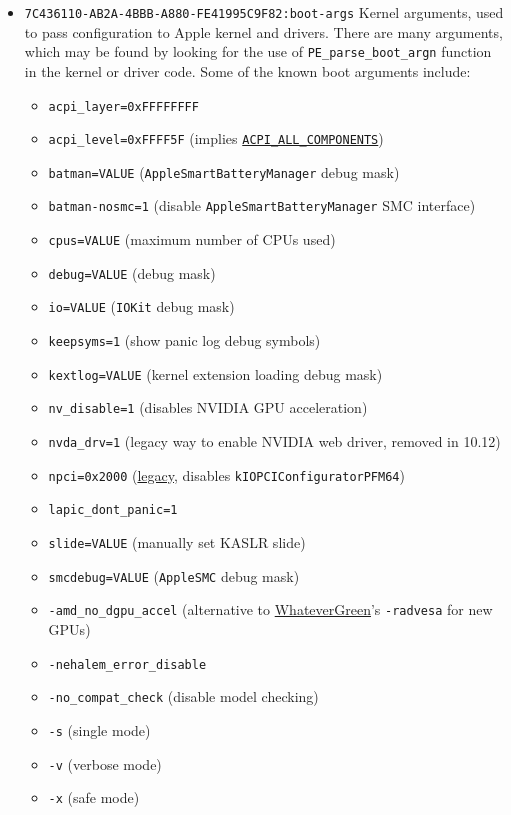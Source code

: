 \documentclass[]{article}
\providecommand{\tightlist}{%
  \setlength{\itemsep}{0pt}\setlength{\parskip}{0pt}}
\begin{document}
\begin{itemize}
\tightlist
\item
  \texttt{7C436110-AB2A-4BBB-A880-FE41995C9F82:boot-args}
  \break
  Kernel arguments, used to pass configuration to Apple kernel and drivers.
  There are many arguments, which may be found by looking for the use of
  \texttt{PE\_parse\_boot\_argn} function in the kernel or driver code.
  Some of the known boot arguments include:

  \begin{itemize}
  \item \texttt{acpi\_layer=0xFFFFFFFF}
  \item \texttt{acpi\_level=0xFFFF5F} (implies
    \href{https://github.com/acpica/acpica/blob/master/source/include/acoutput.h}
    {\texttt{ACPI\_ALL\_COMPONENTS}})
  \item \texttt{batman=VALUE} (\texttt{AppleSmartBatteryManager} debug mask)
  \item \texttt{batman-nosmc=1} (disable \texttt{AppleSmartBatteryManager} SMC interface)
  \item \texttt{cpus=VALUE} (maximum number of CPUs used)
  \item \texttt{debug=VALUE} (debug mask)
  \item \texttt{io=VALUE} (\texttt{IOKit} debug mask)
  \item \texttt{keepsyms=1} (show panic log debug symbols)
  \item \texttt{kextlog=VALUE} (kernel extension loading debug mask)
  \item \texttt{nv\_disable=1} (disables NVIDIA GPU acceleration)
  \item \texttt{nvda\_drv=1} (legacy way to enable NVIDIA web driver, removed in 10.12)
  \item \texttt{npci=0x2000} (\href{https://www.insanelymac.com/forum/topic/260539-1068-officially-released/?do=findComment&comment=1707972}{legacy}, disables \texttt{kIOPCIConfiguratorPFM64})
  \item \texttt{lapic\_dont\_panic=1}
  \item \texttt{slide=VALUE} (manually set KASLR slide)
  \item \texttt{smcdebug=VALUE} (\texttt{AppleSMC} debug mask)
  \item \texttt{-amd\_no\_dgpu\_accel} (alternative to \href{https://github.com/acidanthera/WhateverGreen}{WhateverGreen}'s \texttt{-radvesa} for new GPUs)
  \item \texttt{-nehalem\_error\_disable}
  \item \texttt{-no\_compat\_check} (disable model checking)
  \item \texttt{-s} (single mode)
  \item \texttt{-v} (verbose mode)
  \item \texttt{-x} (safe mode)
  \end{itemize}


\end{itemize}
\end{document}
